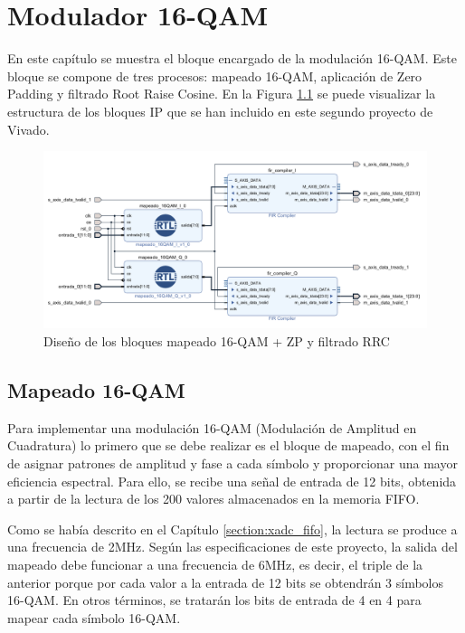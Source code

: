 \chapter{Modulador 16-QAM}
\label{section:qam}


En este capítulo se muestra el bloque encargado de la modulación 16-QAM. Este bloque se compone de tres procesos: mapeado 16-QAM, aplicación de Zero Padding y filtrado Root Raise Cosine. En la Figura \ref{fig:qam_fir} se puede visualizar la estructura de los bloques IP que se han incluido en este segundo proyecto de Vivado. 

\vspace{2mm}

\begin{figure}[h]
	\centering
	\includegraphics[width=1\textwidth]{img/diseno/qam_fir.PNG}
	\caption{Diseño de los bloques mapeado 16-QAM + ZP y filtrado RRC}
	\label{fig:qam_fir}
\end{figure}
    
\vspace{1mm}

\section{Mapeado 16-QAM}

Para implementar una modulación 16-QAM (Modulación de Amplitud en Cuadratura) lo primero que se debe realizar es el bloque de mapeado, con el fin de asignar patrones de amplitud y fase a cada símbolo y proporcionar una mayor eficiencia espectral. Para ello, se recibe una señal de entrada de 12 bits, obtenida a partir de la lectura de los 200 valores almacenados en la memoria FIFO. 

\pagebreak

Como se había descrito en el Capítulo \ref{section:xadc_fifo}, la lectura se produce a una frecuencia de 2MHz. Según las especificaciones de este proyecto, la salida del mapeado debe funcionar a una frecuencia de 6MHz, es decir, el triple de la anterior porque por cada valor a la entrada de 12 bits se obtendrán 3 símbolos 16-QAM. En otros términos, se tratarán los bits de entrada de 4 en 4 para mapear cada símbolo 16-QAM. 

